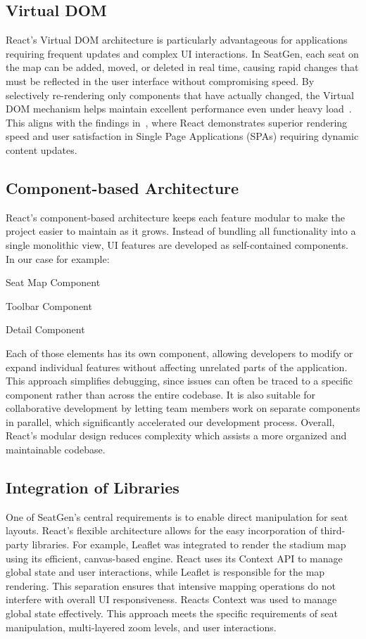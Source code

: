 \subsection{Virtual DOM}
React’s Virtual DOM architecture is particularly advantageous for applications requiring frequent updates and complex UI interactions. In SeatGen, each seat on the map can be added, moved, or deleted in real time, causing rapid changes that must be reflected in the user interface without compromising speed. By selectively re-rendering only components that have actually changed, the Virtual DOM mechanism helps maintain excellent performance even under heavy load~\cite{ReactVirtualDOM}. This aligns with the findings in~\cite{SPAComp}, where React demonstrates superior rendering speed and user satisfaction in Single Page Applications (SPAs) requiring dynamic content updates.

\subsection{Component-based Architecture}
React’s component-based architecture keeps each feature modular to make the project easier to maintain as it grows. Instead of bundling all functionality into a single monolithic view, UI features are developed as self-contained components. In our case for example:
\begin{compactitem}
    \item Seat Map Component
    \item Toolbar Component
    \item Detail Component
\end{compactitem}
Each of those elements has its own component, allowing developers to modify or expand individual features without affecting unrelated parts of the application. This approach simplifies debugging, since issues can often be traced to a specific component rather than across the entire codebase. It is also suitable for collaborative development by letting team members work on separate components in parallel, which significantly accelerated our development process. Overall, React’s modular design reduces complexity which assists a more organized and maintainable codebase.
~\cite{ReactCBA01, ReactCBA02, ReactCBA03}

\subsection{Integration of Libraries}
One of SeatGen’s central requirements is to enable direct manipulation for seat layouts. React’s flexible architecture allows for the easy incorporation of third-party libraries. For example, Leaflet was integrated to render the stadium map using its efficient, canvas-based engine. React uses its Context API to manage global state and user interactions, while Leaflet is responsible for the map rendering. This separation ensures that intensive mapping operations do not interfere with overall UI responsiveness. Reacts Context was used to manage global state effectively. This approach meets the specific requirements of seat manipulation, multi-layered zoom levels, and user interactions.

